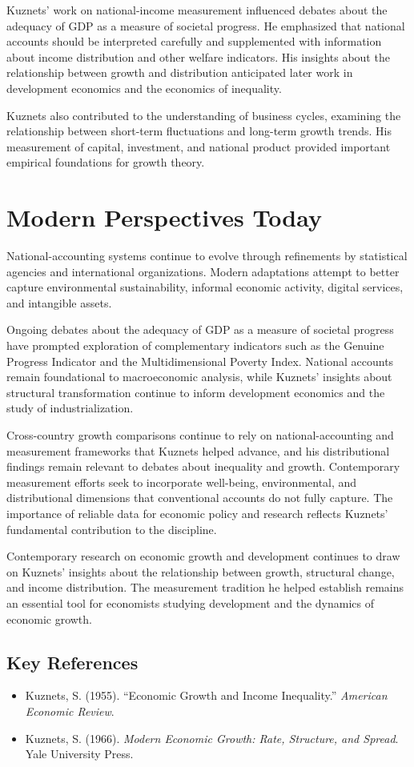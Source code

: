 Kuznets' work on national-income measurement influenced debates about the adequacy of GDP as a
measure of societal progress. He emphasized that national accounts should be interpreted carefully
and supplemented with information about income distribution and other welfare indicators. His
insights about the relationship between growth and distribution anticipated later work in
development economics and the economics of inequality.

Kuznets also contributed to the understanding of business cycles, examining the relationship
between short-term fluctuations and long-term growth trends. His measurement of capital,
investment, and national product provided important empirical foundations for growth theory.

\section{Modern Perspectives Today}
National-accounting systems continue to evolve through refinements by statistical agencies and
international organizations. Modern adaptations attempt to better capture environmental
sustainability, informal economic activity, digital services, and intangible assets.

Ongoing debates about the adequacy of GDP as a measure of societal progress have prompted
exploration of complementary indicators such as the Genuine Progress Indicator and the
Multidimensional Poverty Index. National accounts remain foundational to macroeconomic analysis,
while Kuznets' insights about structural transformation continue to inform development economics
and the study of industrialization.

Cross-country growth comparisons continue to rely on national-accounting and measurement
frameworks that Kuznets helped advance, and his distributional findings remain relevant to debates
about inequality and growth. Contemporary measurement efforts seek to incorporate well-being,
environmental, and distributional dimensions that conventional accounts do not fully capture. The
importance of reliable data for economic policy and research reflects Kuznets' fundamental
contribution to the discipline.

Contemporary research on economic growth and development continues to draw on Kuznets' insights
about the relationship between growth, structural change, and income distribution. The measurement
tradition he helped establish remains an essential tool for economists studying development and the
dynamics of economic growth.

\subsection*{Key References}
\begin{itemize}
    \item Kuznets, S. (1955). ``Economic Growth and Income Inequality.''
    \textit{American Economic Review}.
    \item Kuznets, S. (1966). \textit{Modern Economic Growth: Rate, Structure, and Spread}. Yale University Press.
\end{itemize}
